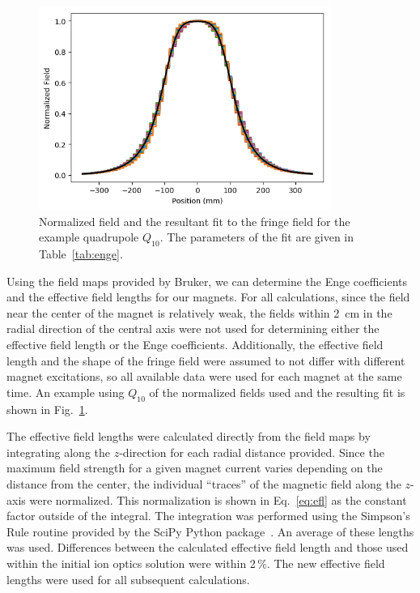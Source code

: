 \begin{figure}[t]
    \begin{center}
        \centerline{
            \includegraphics[width=0.85\textwidth]{figures/enge_fit.png}}
        \caption[Normalized field with Enge fit]{Normalized field and the
            resultant fit to the fringe field for the example quadrupole
            $Q_{10}$. The parameters of the fit are given in
            Table~\ref{tab:enge}.}
        \label{fig:enge_fit}
    \end{center}
\end{figure}

Using the field maps provided by Bruker, we can determine the Enge coefficients
and the effective field lengths for our magnets. For all calculations, since
the field near the center of the magnet is relatively weak, the fields within
2~cm in the radial direction of the central axis were not used for determining
either the effective field length or the Enge coefficients. Additionally, the
effective field length and the shape of the fringe field were assumed to not
differ with different magnet excitations, so all available data were used for
each magnet at the same time. An example using $Q_10$ of the normalized fields
used and the resulting fit is shown in Fig.~\ref{fig:enge_fit}.

The effective field lengths
were calculated directly from the field maps by integrating along the
$z$-direction for each radial distance provided. Since the maximum field
strength for a given magnet current varies depending on the distance from the
center, the individual ``traces'' of the magnetic field along the $z$-axis were
normalized. This normalization is shown in Eq.~\ref{eq:efl} as the constant
factor outside of the integral. The integration was performed using the
Simpson's Rule routine provided by the SciPy Python package~\cite{SciPy}. An
average of these lengths was used. Differences between the calculated effective
field length and those used within the initial ion optics solution were within
2\,\%. The new effective field lengths were used for all subsequent
calculations.

